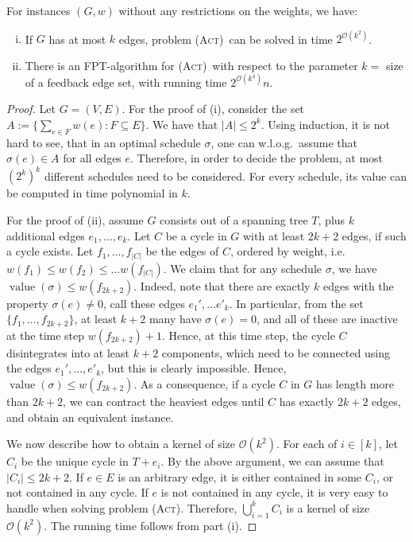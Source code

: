 \documentclass[runningheads]{llncs}
\numberwithin{equation}{section}
\newcommand{\set}[1]{\{ #1 \}}
\newcommand{\fromto}[2]{\set{#1, \ldots, #2}}
\newcommand{\bigO}{\mathcal{O}}
\newcommand{\act}{\textsc{(Act)}}
\DeclareMathOperator{\val}{\text{value}}
\begin{document}
\begin{theorem}
For instances $(G, w)$ without any restrictions on the weights, we have: 
\begin{enumerate}[(i)]
\item If $G$ has at most $k$ edges, problem \act\ can be solved in time $2^{\bigO(k^2)}$.
\item There is an  FPT-algorithm for \act\ with respect to the parameter $k =$ size of a feedback edge set, with running time $2^{\bigO(k^4)}n$. 

\end{enumerate}
\end{theorem}

\begin{proof}
Let $G = (V, E)$. For the proof of (i), consider the set $A := \set{\sum_{e \in F}w(e) : F \subseteq E}$. We have that $|A| \leq 2^k$. Using induction, it is not hard to see, that in an optimal schedule $\sigma$, one can w.l.o.g.\ assume that $\sigma(e) \in A$ for all edges $e$. Therefore, in order to decide the problem, at most $(2^k)^k$ different schedules need to be considered. For every schedule, its value can be computed in time polynomial in $k$. 

For the proof of (ii), assume $G$ consists out of a spanning tree $T$, plus $k$ additional edges $e_1, \dots, e_k$. Let $C$ be a cycle in $G$ with at least $2k+2$ edges, if such a cycle exists. Let $f_1, \dots, f_{|C|}$ be the edges of $C$, ordered by weight, i.e.\ $w(f_1) \leq w(f_2) \leq \dots w(f_{|C|})$. We claim that for any schedule $\sigma$, we have $\val(\sigma) \leq w(f_{2k+2})$. Indeed, note that there are exactly $k$ edges with the property $\sigma(e) \neq 0$, call these edges $e_1', \dots e'_k$. In particular, from the set $\fromto{f_1}{f_{2k+2}}$, at least $k+2$ many have $\sigma(e) = 0$, and all of these are inactive at the time step $w(f_{2k+2}) + 1$. Hence, at this time step, the cycle $C$ disintegrates into at least $k+2$ components, which need to be connected using the edges $e_1', \dots, e'_k$, but this is clearly impossible. Hence, $\val(\sigma) \leq w(f_{2k+2})$. As a consequence, if a cycle $C$ in $G$ has length more than $2k+2$, we can contract the heaviest edges until $C$ has exactly $2k+2$ edges, and obtain an equivalent instance.

We now describe how to obtain a kernel of size $\bigO(k^2)$. For each of $i \in [k]$, let $C_i$ be the unique cycle in $T + e_i$. By the above argument, we can assume that $|C_i| \leq 2k+2$. If $e \in E$ is an arbitrary edge, it is either contained in some $C_i$, or not contained in any cycle. If $e$ is not contained in any cycle, it is very easy to handle when solving problem \act. Therefore, $\bigcup_{i=1}^k C_i$ is a kernel of size $\bigO(k^2)$. The running time follows from part (i).


\end{proof}
\end{document}
